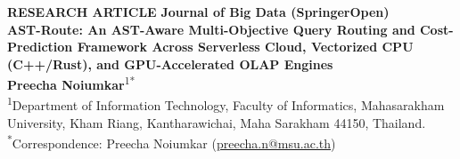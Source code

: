 \documentclass[10pt,a4paper]{article}
\begin{document}
{\footnotesize\sffamily\color{springerblue}\textbf{RESEARCH ARTICLE} \hfill \textbf{Journal of Big Data (SpringerOpen)}}\\[0.8em]

{\LARGE\sffamily\bfseries AST-Route: An AST-Aware Multi-Objective Query Routing and Cost-Prediction Framework Across Serverless Cloud, Vectorized CPU (C++/Rust), and GPU-Accelerated OLAP Engines}\\[0.9em]

{\normalsize\sffamily\textbf{Preecha Noiumkar}\textsuperscript{1*}}\\[0.4em]
{\footnotesize\sffamily
\textsuperscript{1}Department of Information Technology, Faculty of Informatics, Mahasarakham University, Kham Riang, Kantharawichai, Maha Sarakham 44150, Thailand.\\
\textsuperscript{*}Correspondence: Preecha Noiumkar (\href{mailto:preecha.n@msu.ac.th}{preecha.n@msu.ac.th})
}\\[0.8em]
\end{document}
